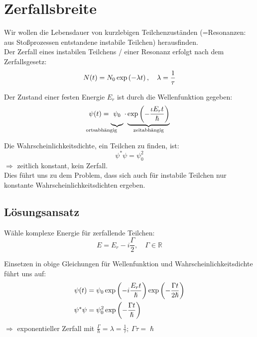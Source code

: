 \documentclass[Ex4_Zusammenfassung.tex]{subfiles}
\begin{document}
\section{Zerfallsbreite}
Wir wollen die Lebensdauer von kurzlebigen Teilchenzuständen (=Resonanzen: aus Stoßprozessen entstandene instabile Teilchen) herausfinden.\\

Der Zerfall eines instabilen Teilchens / einer Resonanz erfolgt nach dem Zerfallsgesetz:
\begin{equation}
	N(t) = N_0 \exp \left( - \lambda t \right), \quad \lambda = \frac{1}{\tau}
\end{equation}

Der Zustand einer festen Energie $E_r$ ist durch die Wellenfunktion gegeben:
\begin{equation}
	\psi(t) = \underbrace{ \vphantom{\lp - \frac{i E_r t}{\hslash} \rp} \psi_0}_{\mathllap{\text{ortsabhängig}}} \cdot \underbrace{\exp \lp - \frac{\iota E_r t}{\hslash} \rp}_{\mathclap{\text{zeitabhängig}}}
\end{equation}

Die Wahrscheinlichkeitsdichte, ein Teilchen zu finden, ist:
\begin{equation}
	\psi^* \psi = \psi_0^2
\end{equation}
$\Rightarrow$ zeitlich konstant, kein Zerfall.\\
Dies führt uns zu dem Problem, dass sich auch für instabile Teilchen nur konstante Wahrscheinlichkeitsdichten ergeben.

\subsection*{Lösungsansatz}
Wähle komplexe Energie für zerfallende Teilchen:
\begin{equation}
	E = E_r - i \frac{\Gamma}{2}, \quad \Gamma \in \mathbb{R}
\end{equation}

Einsetzen in obige Gleichungen für Wellenfunktion und Wahrscheinlichkeitsdichte führt uns auf:
\begin{align}
	\psi(t) &= \psi_0 \exp \left( -i \frac{E_r t}{\hslash}\right) \exp \left( -\frac{\Gamma t}{2 \hslash} \right)\\
	\psi^* \psi &= \psi_0^2 \exp \left( -\frac{\Gamma t}{\hslash}  \right)
\end{align}
$\Rightarrow$ exponentieller Zerfall mit $\frac{\Gamma}{\hslash} = \lambda = \frac{1}{\tau};\ \Gamma \tau = \hslash$\\
\end{document}
